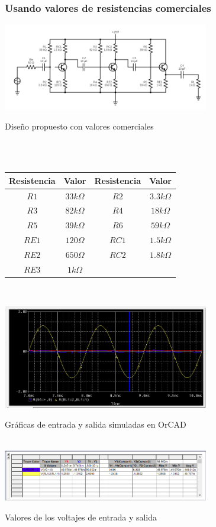 \documentclass[conference]{IEEEtran}
\begin{document}
\subsubsection{Usando valores de resistencias comerciales}
\includegraphics[width=9cm]{imagenes/valores_comerciales.png}
\begin{center}
\caption{Diseño propuesto con valores comerciales}\\
\hspace{1cm}\\
\begin{tabular}{|c c c c|}
		\hline
		Resistencia & Valor & Resistencia & Valor \\ [1ex]
		\hline\hline
		$R1$ & $33k\Omega$ & $R2$ & $3.3k\Omega$\\
        $R3$ & $82k\Omega$ & $R4$ & $18k\Omega$\\
        $R5$ & $39k\Omega$ & $R6$ & $59k\Omega$\\
        $RE1$ & $120\Omega$ & $RC1$ & $1.5k\Omega$\\
        $RE2$ & $650\Omega$ & $RC2$ & $1.8k\Omega$\\
        $RE3$ & $1k\Omega$ & \hspace{1cm} & \hspace{1cm}\\
		\hline
\end{tabular}
\hspace{1cm}\\
\end{center}
\begin{center}
\includegraphics[width=9cm]{imagenes/simulacioncomergraph.png}
\caption{Gráficas de entrada y salida simuladas en OrCAD}\\
\includegraphics[width=9cm]{imagenes/simulacioncomerdata.png}
\caption{Valores de los voltajes de entrada y salida}\\
\end{center}
\end{document}
